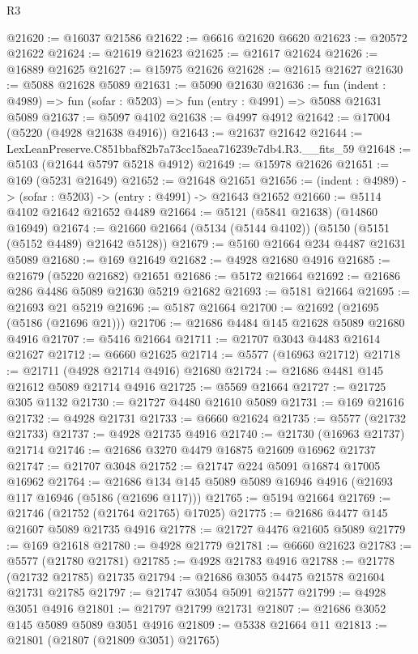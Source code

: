 \begin{lexlean}{R3}
\begin{coremodule}
@21620 := @16037 @21586
@21622 := @6616 @21620 @6620
@21623 := @20572 @21622
@21624 := @21619 @21623
@21625 := @21617 @21624
@21626 := @16889 @21625
@21627 := @15975 @21626
@21628 := @21615 @21627
@21630 := @5088 @21628 @5089
@21631 := @5090 @21630
@21636 := fun (indent : @4989) => fun (sofar : @5203) => fun (entry : @4991) => @5088 @21631 @5089
@21637 := @5097 @4102
@21638 := @4997 @4912
@21642 := @17004 (@5220 (@4928 @21638 @4916))
@21643 := @21637 @21642
@21644 := LexLeanPreserve.C851bbaf82b7a73cc15aea716239c7db4.R3.__fits_59
@21648 := @5103 (@21644 @5797 @5218 @4912)
@21649 := @15978 @21626
@21651 := @169 (@5231 @21649)
@21652 := @21648 @21651
@21656 := (indent : @4989) -> (sofar : @5203) -> (entry : @4991) -> @21643 @21652
@21660 := @5114 @4102 @21642 @21652 @4489
@21664 := @5121 (@5841 @21638) (@14860 @16949)
@21674 := @21660 @21664 (@5134 (@5144 @4102)) (@5150 (@5151 (@5152 @4489) @21642 @5128))
@21679 := @5160 @21664 @234 @4487 @21631 @5089
@21680 := @169 @21649
@21682 := @4928 @21680 @4916
@21685 := @21679 (@5220 @21682) @21651
@21686 := @5172 @21664
@21692 := @21686 @286 @4486 @5089 @21630 @5219 @21682
@21693 := @5181 @21664
@21695 := @21693 @21 @5219
@21696 := @5187 @21664
@21700 := @21692 (@21695 (@5186 (@21696 @21)))
@21706 := @21686 @4484 @145 @21628 @5089 @21680 @4916
@21707 := @5416 @21664
@21711 := @21707 @3043 @4483 @21614 @21627
@21712 := @6660 @21625
@21714 := @5577 (@16963 @21712)
@21718 := @21711 (@4928 @21714 @4916) @21680
@21724 := @21686 @4481 @145 @21612 @5089 @21714 @4916
@21725 := @5569 @21664
@21727 := @21725 @305 @1132
@21730 := @21727 @4480 @21610 @5089
@21731 := @169 @21616
@21732 := @4928 @21731
@21733 := @6660 @21624
@21735 := @5577 (@21732 @21733)
@21737 := @4928 @21735 @4916
@21740 := @21730 (@16963 @21737) @21714
@21746 := @21686 @3270 @4479 @16875 @21609 @16962 @21737
@21747 := @21707 @3048
@21752 := @21747 @224 @5091 @16874 @17005 @16962
@21764 := @21686 @134 @145 @5089 @5089 @16946 @4916 (@21693 @117 @16946 (@5186 (@21696 @117)))
@21765 := @5194 @21664
@21769 := @21746 (@21752 (@21764 @21765) @17025)
@21775 := @21686 @4477 @145 @21607 @5089 @21735 @4916
@21778 := @21727 @4476 @21605 @5089
@21779 := @169 @21618
@21780 := @4928 @21779
@21781 := @6660 @21623
@21783 := @5577 (@21780 @21781)
@21785 := @4928 @21783 @4916
@21788 := @21778 (@21732 @21785) @21735
@21794 := @21686 @3055 @4475 @21578 @21604 @21731 @21785
@21797 := @21747 @3054 @5091 @21577
@21799 := @4928 @3051 @4916
@21801 := @21797 @21799 @21731
@21807 := @21686 @3052 @145 @5089 @5089 @3051 @4916
@21809 := @5338 @21664 @11
@21813 := @21801 (@21807 (@21809 @3051) @21765)

\end{coremodule}
\end{lexlean}
